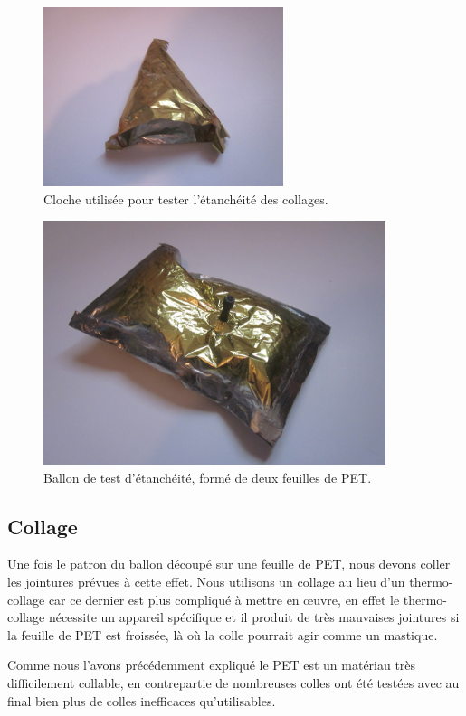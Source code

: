 \documentclass[a4paper,11pt]{article}
\begin{document}
\begin{figure}[H]
 \centering
 \includegraphics[width=7cm]{../Images/cloche_colle.JPG}
 \caption{Cloche utilisée pour tester l'étanchéité des collages.}
\end{figure}

\begin{figure}[H]
 \centering
 \includegraphics[width=10cm]{../Images/ballon_etanche.JPG}
 \caption{Ballon de test d'étanchéité, formé de deux feuilles de PET.}
\end{figure}


\subsection{Collage}

Une fois le patron du ballon découpé sur une feuille de PET, nous devons coller les jointures prévues à cette effet. Nous utilisons un collage au lieu d'un thermo-collage car ce dernier est plus compliqué à mettre en œuvre, en effet le thermo-collage nécessite un appareil spécifique et il produit de très mauvaises jointures si la feuille de PET est froissée, là où la colle pourrait agir comme un mastique.

Comme nous l'avons précédemment expliqué le PET est un matériau très difficilement collable, en contrepartie de nombreuses colles ont été testées avec au final bien plus de colles inefficaces qu'utilisables.
\end{document}
